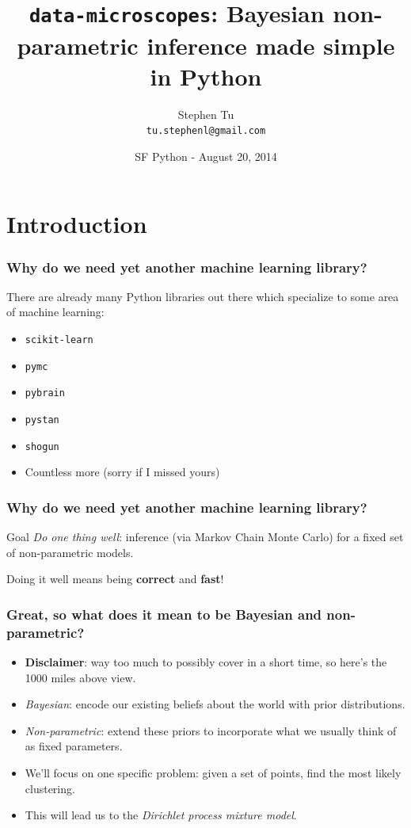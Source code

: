 \documentclass{beamer}
\title[data-microscopes]{
  \texttt{data-microscopes}: Bayesian non-parametric inference made simple in Python
}
\author[Stephen Tu]{Stephen Tu \\ \texttt{tu.stephenl@gmail.com}}
\date[SF Python]{SF Python - August 20, 2014}
\begin{document}
\begin{frame}
\titlepage
\end{frame}

\section{Introduction}

\begin{frame}
\frametitle{Why do we need yet another machine learning library?}
There are already many Python libraries out there which specialize to 
some area of machine learning:
\begin{itemize}[<+->]
  \item \texttt{scikit-learn}
  \item \texttt{pymc}
  \item \texttt{pybrain}
  \item \texttt{pystan}
  \item \texttt{shogun}
  \item Countless more (sorry if I missed yours)
\end{itemize}
\end{frame}


\begin{frame}
\frametitle{Why do we need yet another machine learning library?}
\begin{block}{Goal}
\emph{Do one thing well}: inference (via Markov Chain Monte Carlo)
for a fixed set of non-parametric models.
\end{block}

Doing it well means being \textbf{correct} and \textbf{fast}!
\end{frame}

\begin{frame}
\frametitle{Great, so what does it mean to be Bayesian and non-parametric?}
\begin{itemize}[<+->]
  \item \textbf{Disclaimer}: way too much to possibly cover in a short time, 
    so here's the 1000 miles above view.
  \item \emph{Bayesian}: encode our existing beliefs about the world with prior distributions.
  \item \emph{Non-parametric}: extend these priors to incorporate what we usually
    think of as fixed parameters.
  \item We'll focus on one specific problem: 
    given a set of points, find the most likely clustering.
  \item This will lead us to the \emph{Dirichlet process mixture model}.
\end{itemize}
\end{frame}
\end{document}
